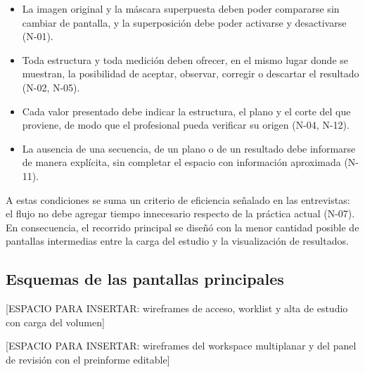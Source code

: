\begin{itemize}
  \item La imagen original y la máscara superpuesta deben poder compararse sin cambiar de pantalla, y la superposición debe poder activarse y desactivarse (N-01).
  \item Toda estructura y toda medición deben ofrecer, en el mismo lugar donde se muestran, la posibilidad de aceptar, observar, corregir o descartar el resultado (N-02, N-05).
  \item Cada valor presentado debe indicar la estructura, el plano y el corte del que proviene, de modo que el profesional pueda verificar su origen (N-04, N-12).
  \item La ausencia de una secuencia, de un plano o de un resultado debe informarse de manera explícita, sin completar el espacio con información aproximada (N-11).
\end{itemize}

A estas condiciones se suma un criterio de eficiencia señalado en las entrevistas: el flujo no debe agregar tiempo innecesario respecto de la práctica actual (N-07). En consecuencia, el recorrido principal se diseñó con la menor cantidad posible de pantallas intermedias entre la carga del estudio y la visualización de resultados.

\subsection{Esquemas de las pantallas principales}

[ESPACIO PARA INSERTAR: wireframes de acceso, worklist y alta de estudio con carga del volumen]


[ESPACIO PARA INSERTAR: wireframes del workspace multiplanar y del panel de revisión con el preinforme editable]


